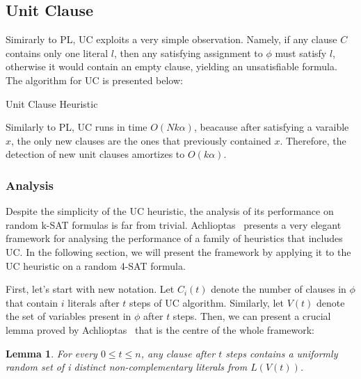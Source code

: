 \documentclass[10pt]{article}
\newtheorem{lemma}[theorem]{Lemma}
\begin{document}
\subsection{Unit Clause}
Simirarly to PL, UC exploits a very simple observation. Namely, if any clause $C$ contains only one literal $l$, then any satisfying assignment to $\phi$ must satisfy $l$, otherwise it would contain an empty clause, yielding an unsatisfiable formula. The algorithm for UC is presented below:
\begin{algorithm}
\caption{Unit Clause Heuristic}\label{alg:uc}
\end{algorithm}
\par Similarly to PL, UC runs in time $O(N k \alpha)$, beacause after satisfying a varaible $x$, the only new clauses are the ones that previously contained $x$. Therefore, the detection of new unit clauses amortizes to $O(k \alpha)$.
\subsubsection*{Analysis}

Despite the simplicity of the UC heuristic, the analysis of its performance on random k-SAT formulas is far from trivial. Achlioptas~\cite{satdiffeq} presents a very elegant framework for analysing the performance of a family of heuristics that includes UC\@. In the following section, we will present the framework by applying it to the UC heuristic on a random 4-SAT formula.
\par
First, let's start with new notation. Let $C_i(t)$ denote the number of clauses in $\phi$ that contain $i$ literals after $t$ steps of UC algorithm. Similarly, let $V(t)$ denote the set of variables present in $\phi$ after $t$ steps. Then, we can present a crucial lemma proved by Achlioptas~\cite{satdiffeq} that is the centre of the whole framework:
\begin{lemma}\label{lem:uni_rand}
    For every $ 0 \le t \le n$, any clause after $t$ steps contains a uniformly random set of i distinct non-complementary literals from $L(V(t))$.
\end{lemma}
\end{document}
